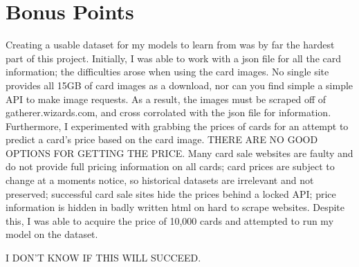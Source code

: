 \section{Bonus Points}
\label{bonus_points}

Creating a usable dataset for my models to learn from
was by far the hardest part of this project. Initially,
I was able to work with a json file for all the card information;
the difficulties arose when using the card images. No single
site provides all 15GB of card images as a download, nor can 
you find simple a simple API to make image requests. As a result,
the images must be scraped off of gatherer.wizards.com, and cross
corrolated with the json file for information. Furthermore, I 
experimented with grabbing the prices of cards for an attempt to
predict a card's price based on the card image. THERE ARE NO GOOD 
OPTIONS FOR GETTING THE PRICE. Many card sale websites are faulty 
and do not provide full pricing information on all cards; card prices
are subject to change at a moments notice, so historical datasets are 
irrelevant and not preserved; successful card sale sites hide the prices
behind a locked API; price information is hidden in badly written html
on hard to scrape websites. Despite this, I was able to acquire the price
of 10,000 cards and attempted to run my model on the dataset. 

I DON'T KNOW IF THIS WILL SUCCEED.